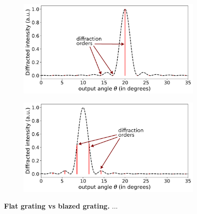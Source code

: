 \documentclass[12pt]{iopart}
\begin{document}
\begin{figure}
  \centering
  \begin{subfigure}{0.49\textwidth}
  \centering
  \includegraphics[width = \textwidth]{images/gratings_flat.pdf}
  \label{fig:flat_grating}
  \end{subfigure}
  \begin{subfigure}{0.49\textwidth}
  \centering
  \includegraphics[width = \textwidth]{images/gratings_blazed.pdf}
  \label{fig:blazed_right}
  \end{subfigure}
  \caption{
  \textbf{Flat grating vs blazed grating.}
 ...
  }
  \label{fig:gratings}
  \end{figure}


\end{document}
